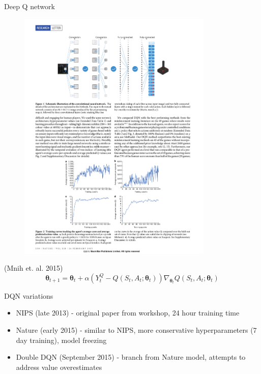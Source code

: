 \documentclass{beamer}
\begin{document}
\begin{frame}{Deep Q network}
  \begin{figure}[H]
    \centering
    \includegraphics[width=93mm]{deep_q_network.pdf}
  \end{figure}
  (Mnih et. al. 2015)
  \[ \boldsymbol{\theta}_{t+1} = \boldsymbol{\theta}_t+\alpha(Y_t^Q-Q(S_t,A_t;\boldsymbol{\theta}_t))\nabla_{\boldsymbol{\theta}_t}Q(S_t,A_t;\boldsymbol{\theta}_t) \]
\end{frame}

\begin{frame}{DQN variations}
  \begin{itemize}
  \item {
      NIPS (late 2013) - original paper from workshop, 24 hour training time
  }
  \item {
      Nature (early 2015) - similar to NIPS, more conservative hyperparameters (7 day training), model freezing
  }
  \item {
      Double DQN (September 2015) - branch from Nature model, attempts to address value overestimates
  }
  \end{itemize}
\end{frame}
\end{document}

